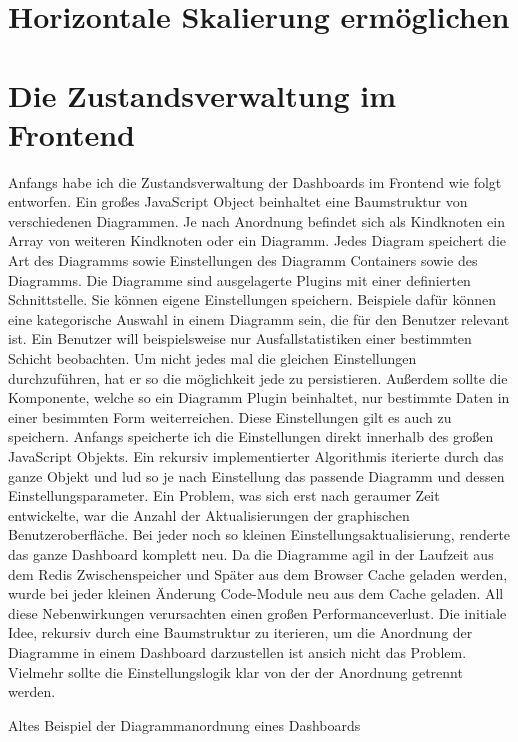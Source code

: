 \section{Horizontale Skalierung ermöglichen}

\section{Die Zustandsverwaltung im Frontend}
Anfangs habe ich die Zustandsverwaltung der Dashboards im Frontend wie
folgt entworfen. Ein großes JavaScript Object beinhaltet eine Baumstruktur
von verschiedenen Diagrammen. Je nach Anordnung befindet sich als Kindknoten
ein Array von weiteren Kindknoten oder ein Diagramm. Jedes Diagram speichert
die Art des Diagramms sowie Einstellungen des Diagramm Containers sowie des
Diagramms. Die Diagramme sind ausgelagerte Plugins mit einer definierten
Schnittstelle. Sie können eigene Einstellungen speichern. Beispiele dafür
können eine kategorische Auswahl in einem Diagramm sein, die für den Benutzer
relevant ist. Ein Benutzer will beispielsweise nur Ausfallstatistiken einer
bestimmten Schicht beobachten. Um nicht jedes mal die gleichen Einstellungen
durchzuführen, hat er so die möglichkeit jede zu persistieren. Außerdem sollte
die Komponente, welche so ein Diagramm Plugin beinhaltet, nur bestimmte Daten
in einer besimmten Form weiterreichen. Diese Einstellungen gilt es auch zu speichern.
Anfangs speicherte ich die Einstellungen direkt innerhalb des großen JavaScript Objekts.
Ein rekursiv implementierter Algorithmis iterierte durch das ganze Objekt und lud so 
je nach Einstellung das passende Diagramm und dessen Einstellungsparameter. Ein Problem,
was sich erst nach geraumer Zeit entwickelte, war die Anzahl der Aktualisierungen
der graphischen Benutzeroberfläche. Bei jeder noch so kleinen Einstellungsaktualisierung,
renderte das ganze Dashboard komplett neu. Da die Diagramme agil in der Laufzeit aus dem
Redis Zwischenspeicher und Später aus dem Browser Cache geladen werden, wurde bei jeder
kleinen Änderung Code-Module neu aus dem Cache geladen. All diese Nebenwirkungen
verursachten einen großen Performanceverlust. Die initiale Idee, rekursiv durch
eine Baumstruktur zu iterieren, um die Anordnung der Diagramme in einem Dashboard
darzustellen ist ansich nicht das Problem. Vielmehr sollte die Einstellungslogik klar
von der der Anordnung getrennt werden.  

\begin{listing}
    \label{lst:HelloJSX}
    \caption{Altes Beispiel der Diagrammanordnung eines Dashboards }
    \inputminted{jsx}{snippets/json/OldArrangement.json}
\end{listing}


